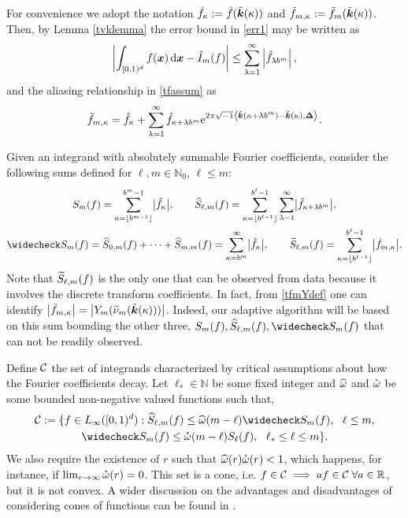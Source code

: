 \documentclass[graybox]{svmult}
\newcommand{\R}{\mathbb{R}} %
\newcommand{\N}{\mathbb{N}} %
\newcommand{\bsx}{\boldsymbol{x}}    %
\newcommand{\bsDelta}{\boldsymbol{\Delta}}    %
\begin{document}
For convenience we adopt the notation $\hat{f}_{\kappa} :=\hat{f}(\tilde{\boldsymbol{k}}(\kappa))$ and $\tilde{f}_{m,\kappa} := \tilde{f}_m(\tilde{\boldsymbol{k}}(\kappa))$. Then, by Lemma  \ref{tvklemma} the error bound in \eqref{err1} may be written as
\begin{equation}
\biggabs{ \int_{\cube} f(\bsx) \, \D \bsx - \hI_m(f)} 
\le \sum_{\lambda=1}^{\infty} \left \lvert \hf_{\lambda b^m}\right \rvert, \label{err2}
\end{equation}
and the aliasing relationship in \eqref{tfassum} as
\begin{align}
\tf_{m,\kappa} =\hf_{\kappa} + \sum_{\lambda=1}^{\infty} \hf_{\kappa+\lambda b^{m}} \E^{2 \pi \sqrt{-1} \ip{\tvk(\kappa+\lambda b^{m}) - \tvk(\kappa)}{\bsDelta}}. \label{tfassumc}
\end{align}

Given an integrand with absolutely summable Fourier coefficients, consider the following sums defined for $\ell,m \in \N_0$, $\ell \le m$:
\begin{gather*}
S_m(f) =  \sum_{\kappa=\left \lfloor b^{m-1} \right \rfloor}^{b^{m}-1} \bigabs{\hf_{\kappa}}, \qquad 
\hS_{\ell,m}(f)  = \sum_{\kappa=\left \lfloor b^{\ell-1} \right \rfloor}^{b^{\ell}-1} \sum_{\lambda=1}^{\infty} \bigabs{ \hf_{\kappa+\lambda b^{m}}}, \\
\wcS_m(f)=\hS_{0,m}(f) + \cdots + \hS_{m,m}(f)=
\sum_{\kappa=b^{m}}^{\infty} \bigabs{\hf_{\kappa}}, \qquad
\tS_{\ell,m}(f) = \sum_{\kappa=\left \lfloor b^{\ell-1}\right \rfloor}^{b^{\ell}-1} \bigabs{\tf_{m,\kappa}}.
\end{gather*}
Note that $\widetilde{S}_{\ell,m}(f)$ is the only one that can be observed from data because it involves the discrete transform coefficients. In fact, from \eqref{tfmYdef} one can identify $\bigl \lvert \tilde{f}_{m,\kappa} \bigr \rvert = \bigl \lvert Y_m(\widetilde{\nu}_m(\tilde{\boldsymbol{k}}(\kappa))) \bigr \rvert$.  Indeed, our adaptive algorithm will be based on this sum bounding the other three, $S_m(f),\hS_{\ell,m}(f),\wcS_m(f)$ that can not be readily observed. 

Define $\mathcal{C}$ the set of integrands characterized by critical assumptions about how the Fourier coefficients decay.  Let $\ell_* \in \N$ be some fixed integer and $\widehat{\omega}$ and $\mathring{\omega}$ be some bounded non-negative valued functions such that,
\begin{multline} \label{conecond}
\cc:=\{f \in \Lebesgue_\infty(\cube) : \hS_{\ell,m}(f) \le \homega(m-\ell) \wcS_m(f),\ \ \ell \le m, \\
\wcS_m(f) \le \wcomega(m-\ell) S_{\ell}(f),\ \  \ell_* \le \ell \le m\}.
\end{multline}
We also require the existence of $r$ such that $\widehat{\omega}(r) \mathring{\omega}(r)<1$, which happens, for instance, if $\lim_{r\rightarrow\infty}\mathring{\omega}(r)=0$. This set is a cone, i.e. $f \in \cc \implies af \in \cc\;\forall a\in\R$, but it is not convex. A wider discussion on the advantages and disadvantages of considering cones of functions can be found in \cite{Clancy201421}.
\end{document}
